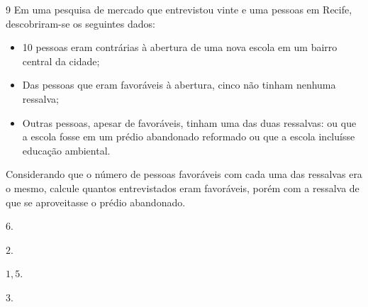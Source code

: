 
\num{9} Em uma pesquisa de mercado que entrevistou vinte e uma pessoas em Recife,
descobriram-se os seguintes dados:

\begin{itemize}
\item 10 pessoas eram contrárias à abertura de uma nova escola em um bairro central da cidade;

\item Das pessoas que eram favoráveis à abertura, cinco não tinham nenhuma ressalva;

\item Outras pessoas, apesar de favoráveis, tinham uma das duas ressalvas: ou que a escola fosse em um prédio abandonado reformado ou que a escola incluísse educação ambiental.
\end{itemize}

Considerando que o número de pessoas favoráveis com cada uma das ressalvas era o mesmo,
calcule quantos entrevistados eram favoráveis, porém com a ressalva de que se aproveitasse
o prédio abandonado.

\begin{escolha}
\item $6$.
\item $2$.
\item $1,5$.
\item $3$.
\end{escolha}



